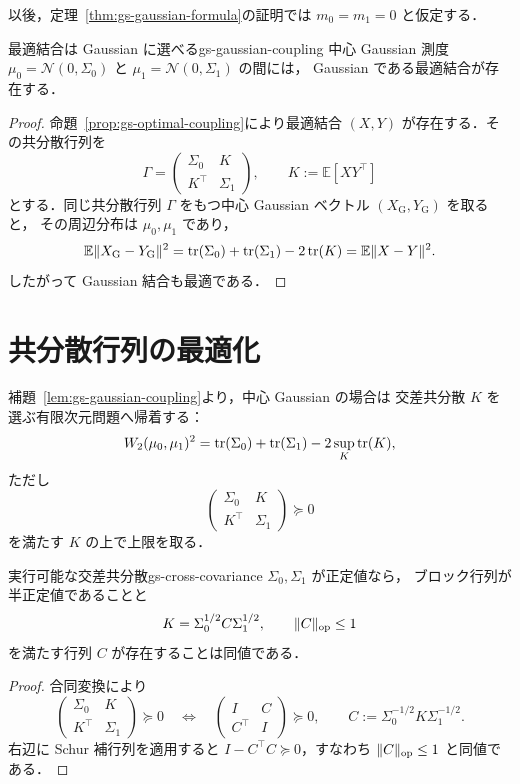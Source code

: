 以後，定理~\ref{thm:gs-gaussian-formula}の証明では
$m_0=m_1=0$ と仮定する．

\begin{lemma}{最適結合は Gaussian に選べる}{gs-gaussian-coupling}
  中心 Gaussian 測度
  $\mu_0=\mathcal{N}(0,\Sigma_0)$ と
  $\mu_1=\mathcal{N}(0,\Sigma_1)$ の間には，
  Gaussian である最適結合が存在する．
\end{lemma}

\begin{proof}
  命題~\ref{prop:gs-optimal-coupling}により最適結合
  $(X,Y)$ が存在する．その共分散行列を
  \[
    \Gamma
    =
    \begin{pmatrix}
      \Sigma_0 & K\\
      K^\top & \Sigma_1
    \end{pmatrix},
    \qquad
    K:=\mathbb{E}[XY^\top]
  \]
  とする．同じ共分散行列 $\Gamma$ をもつ中心 Gaussian ベクトル
  $(X_{\mathrm{G}},Y_{\mathrm{G}})$ を取ると，
  その周辺分布は $\mu_0,\mu_1$ であり，
  \[
    \mathbb{E}\lVert X_{\mathrm{G}}-Y_{\mathrm{G}} \rVert^2
    =
    \operatorname{tr}(\Sigma_0)+\operatorname{tr}(\Sigma_1)-2\operatorname{tr}(K)
    =
    \mathbb{E}\lVert X-Y \rVert^2.
  \]
  したがって Gaussian 結合も最適である．
\end{proof}

\section{共分散行列の最適化}
\label{sec:covariance-optimization}

補題~\ref{lem:gs-gaussian-coupling}より，中心 Gaussian の場合は
交差共分散 $K$ を選ぶ有限次元問題へ帰着する：
\[
  W_2(\mu_0,\mu_1)^2
  =
  \operatorname{tr}(\Sigma_0)+\operatorname{tr}(\Sigma_1)
  -2\sup_K\operatorname{tr}(K),
\]
ただし
\[
  \begin{pmatrix}
    \Sigma_0 & K\\
    K^\top & \Sigma_1
  \end{pmatrix}
  \succeq0
\]
を満たす $K$ の上で上限を取る．

\begin{lemma}{実行可能な交差共分散}{gs-cross-covariance}
  $\Sigma_0,\Sigma_1$ が正定値なら，
  ブロック行列が半正定値であることと
  \[
    K=\Sigma_0^{1/2}C\Sigma_1^{1/2},
    \qquad
    \lVert C \rVert_{\mathrm{op}}\leq1
  \]
  を満たす行列 $C$ が存在することは同値である．
\end{lemma}

\begin{proof}
  合同変換により
  \[
    \begin{pmatrix}
      \Sigma_0 & K\\
      K^\top & \Sigma_1
    \end{pmatrix}
    \succeq0
    \quad\Longleftrightarrow\quad
    \begin{pmatrix}
      I & C\\
      C^\top & I
    \end{pmatrix}
    \succeq0,
    \qquad
    C:=\Sigma_0^{-1/2}K\Sigma_1^{-1/2}.
  \]
  右辺に Schur 補行列を適用すると
  $I-C^\top C\succeq0$，すなわち
  $\lVert C \rVert_{\mathrm{op}}\leq1$ と同値である．
\end{proof}

